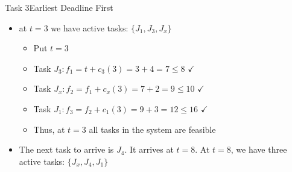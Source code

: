 \begin{frame}[allowframebreaks]{Task 3}{Earliest Deadline First\vspace{0.5cm}}
\begin{itemize}
\begin{itemize}
      \item at $t = 0$ we have \alert{active tasks} (\alert{arrived} but \alert{not finished}): $\{J_1, J_3\}$
      \begin{itemize}
        \item Put $t=0$
        \item Task $J_3: f_1=t+c_3(0)=0+6=6 \leq 8$ $\checkmark$
        \item Task $J_1: f_2=f_1+c_1(0)=6+3=9 \leq 16$ $\checkmark$
      \end{itemize}
      \item at $t = 2$ we have \alert{active tasks:} $\{J_1, J_2, J_3\}$
      \begin{itemize}
        \item Put $t=2$
        \item Task $J_2: f_1=t+c_3(2)=2+1=3 \leq 7$ $\checkmark$
        \item Task $J_3: f_2=f_1+c_2(2)=3+4=7 \leq 8$ $\checkmark$
        \item Task $J_1: f_3=f_2+c_1(2)=7+3=9 \leq 16$ $\checkmark$
      \end{itemize}
      \item task $J_2$ finishes \alert{before} its deadline at $t = 3$
    \end{itemize}
  \item at $t = 3$ we have active tasks: $\{J_1, J_3, J_x\}$
    \begin{itemize}
      \item Put $t=3$
      \item Task $J_3: f_1=t+c_3(3)=3+4=7 \leq 8$ $\checkmark$
      \item Task $J_x: f_2=f_1+c_x(3)=7+2=9 \leq 10$ $\checkmark$
      \item Task $J_1: f_3=f_2+c_1(3)=9+3=12 \leq 16$ $\checkmark$
      \item Thus, at $t=3$ \alert{all} tasks in the system are feasible
    \end{itemize}
\item The next task to arrive is $J_4$. It arrives at $t=8$. At $t=8$, we have three active tasks: $\{J_x, J_4, J_1\}$

\end{itemize}
\end{frame}
